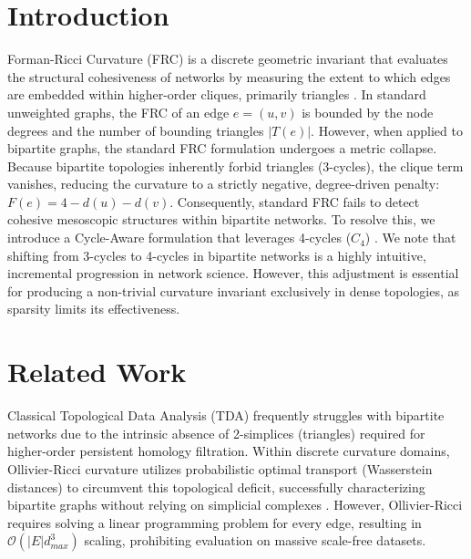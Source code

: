 \documentclass{siuro250211}
\begin{document}
\section{Introduction}
Forman-Ricci Curvature (FRC) \cite{forman2003bochner} is a discrete geometric invariant that evaluates the structural cohesiveness of networks by measuring the extent to which edges are embedded within higher-order cliques, primarily triangles \cite{sreejith2016forman}. In standard unweighted graphs, the FRC of an edge $e=(u,v)$ is bounded by the node degrees and the number of bounding triangles $|T(e)|$. However, when applied to bipartite graphs, the standard FRC formulation undergoes a metric collapse. Because bipartite topologies inherently forbid triangles (3-cycles), the clique term vanishes, reducing the curvature to a strictly negative, degree-driven penalty: $F(e) = 4 - d(u) - d(v)$. Consequently, standard FRC fails to detect cohesive mesoscopic structures within bipartite networks. To resolve this, we introduce a Cycle-Aware formulation that leverages 4-cycles ($C_4$) \cite{opsahl2013triadic, latapy2008basic}. We note that shifting from 3-cycles to 4-cycles in bipartite networks is a highly intuitive, incremental progression in network science. However, this adjustment is essential for producing a non-trivial curvature invariant exclusively in dense topologies, as sparsity limits its effectiveness.

\section{Related Work}
Classical Topological Data Analysis (TDA) frequently struggles with bipartite networks due to the intrinsic absence of 2-simplices (triangles) required for higher-order persistent homology filtration. Within discrete curvature domains, Ollivier-Ricci curvature \cite{ollivier2009ricci} utilizes probabilistic optimal transport (Wasserstein distances) to circumvent this topological deficit, successfully characterizing bipartite graphs without relying on simplicial complexes \cite{ni2015ricci, samal2018comparative}. However, Ollivier-Ricci requires solving a linear programming problem for every edge, resulting in $\mathcal{O}(|E| d_{max}^3)$ scaling, prohibiting evaluation on massive scale-free datasets. 
\end{document}
